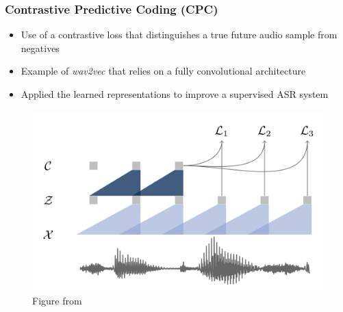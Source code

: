 \documentclass[table]{beamer}
\begin{document}
\begin{frame}
	\frametitle{Contrastive Predictive Coding (CPC)}
		\begin{itemize}
			\item Use  of a contrastive loss that distinguishes a true future audio sample from negatives
			\item Example of \textit{wav2vec} \citep{DBLP:journals/corr/abs-1904-05862} that relies on a fully convolutional architecture
			\item Applied the learned representations to improve a supervised ASR system
		\end{itemize} 

		\begin{figure}
			\centering
			\includegraphics[scale=0.21]	{unsupervisedspeech.png} 
			\caption{Figure from \citep{DBLP:journals/corr/abs-1904-05862}}
			\label{fig:unsup}
			\end{figure}

	
\end{frame}
\end{document}
